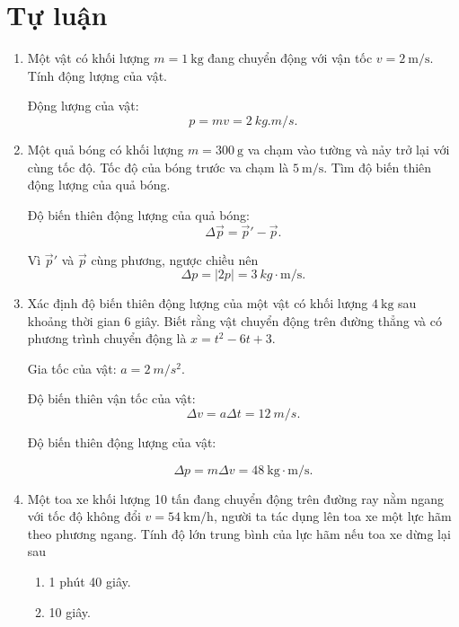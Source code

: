 \section{Tự luận}
\begin{enumerate}[label=\bfseries Câu \arabic*:, leftmargin=1.5cm]
	
	\item {}
	
	
	{
		Một vật có khối lượng $m=\SI{1}{\kilogram}$ đang chuyển động với vận tốc $v=\SI{2}{\meter/\second}$. Tính động lượng của vật.
	}
	
	\hideall
	{	
		Động lượng của vật: $$p=mv=\SI{2}{kg.m/s}.$$
	}
	
	\item {}
	
	
	{
		Một quả bóng có khối lượng $m=\SI{300}{\gram}$ va chạm vào tường và nảy trở lại với cùng tốc độ. Tốc độ của bóng trước va chạm là $\SI{5}{\meter/\second}$. Tìm độ biến thiên động lượng của quả bóng.
	}
	
	\hideall
	{	
		Độ biến thiên động lượng của quả bóng:
		$$\Delta \vec p  = \vec p' - \vec p.$$
		
		Vì $\vec p'$ và $\vec p$ cùng phương, ngược chiều nên $$\Delta p = \left|2p\right| = \SI{3}{kg\cdot \meter/\second}.$$
	}
	
	\item {}
	
	
	{
		Xác định độ biến thiên động lượng của một vật có khối lượng $\SI{4}{\kilogram}$ sau khoảng thời gian 6 giây. Biết rằng vật chuyển động trên đường thẳng và có phương trình chuyển động là $x=t^2-6t+3$.
	}
	
	\hideall
	{	
		Gia tốc của vật: $a=\SI{2}{m/s^2}$.
		
		Độ biến thiên vận tốc của vật:
		$$\Delta v =a\Delta t= \SI{12}{m/s}.$$
		
		Độ biến thiên động lượng của vật: 
		
		$$\Delta p = m\Delta v = \SI{48}{\kilogram\cdot\meter/\second}.$$
	}
	
	\item {}
	
	
	{
		Một toa xe khối lượng 10 tấn đang chuyển động trên đường ray nằm ngang với tốc độ không đổi $v=\SI{54}{\kilo\meter/\hour}$, người ta tác dụng lên toa xe một lực hãm theo phương ngang. Tính độ lớn trung bình của lực hãm nếu toa xe dừng lại sau
		\begin{enumerate}[label=\alph*)]
			\item 1 phút 40 giây.
			\item 10 giây.
		\end{enumerate}
	}
	

\end{enumerate}
